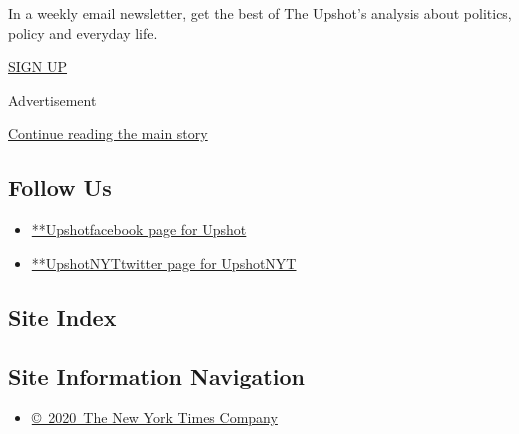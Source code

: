 In a weekly email newsletter, get the best of The Upshot's analysis
about politics, policy and everyday life.

\href{/newsletters/signup/UP}{SIGN UP}

Advertisement

\protect\hyperlink{after-mktg}{Continue reading the main story}

\hypertarget{follow-us}{%
\subsection{Follow Us}\label{follow-us}}

\begin{itemize}
\tightlist
\item
  \href{https://www.facebookcorewwwi.onion/Upshot}{**Upshotfacebook page
  for Upshot}
\item
  \href{https://twitter.com/UpshotNYT}{**UpshotNYTtwitter page for
  UpshotNYT}
\end{itemize}

\hypertarget{site-index}{%
\subsection{Site Index}\label{site-index}}

\hypertarget{site-information-navigation}{%
\subsection{Site Information
Navigation}\label{site-information-navigation}}

\begin{itemize}
\tightlist
\item
  \href{https://help.nytimes3xbfgragh.onion/hc/en-us/articles/115014792127-Copyright-notice}{©~2020~The
  New York Times Company}
\end{itemize}

